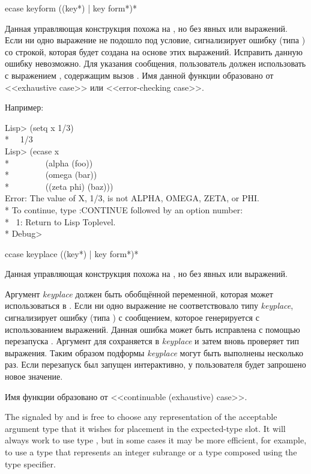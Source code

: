 \begin{defmac}
ecase keyform {({({key}*) | key} {form}*)}*

Данная управляющая конструкция похожа на , но без явных
 или  выражений. Если ни одно выражение не подошло под
условие,  сигнализирует ошибку (типа ) со строкой,
которая будет создана на основе этих выражений. Исправить данную ошибку
невозможно. Для указания сообщения, пользователь должен использовать 
с выражением , содержащим вызов . Имя данной функции
образовано от <<exhaustive case>> или <<error-checking case>>.

Например:
\begin{lisp}
Lisp> (setq x 1/3) \\*
~\EV\ 1/3 \\
Lisp> (ecase x \\*
~~~~~~~~(alpha (foo)) \\*
~~~~~~~~(omega (bar)) \\*
~~~~~~~~((zeta phi) (baz))) \\
Error: The value of X, 1/3, is not ALPHA, OMEGA, ZETA, or PHI. \\*
To continue, type :CONTINUE followed by an option number: \\*
~1: Return to Lisp Toplevel. \\*
Debug>
\end{lisp}
\end{defmac}

\begin{defmac}
ccase keyplace {({({key}*) | key} {form}*)}*

Данная управляющая конструкция похожа на , но без явных
 или  выражений.

Аргумент \emph{keyplace} должен быть обобщённой переменной, которая может
использоваться в . Если ни одно выражение не соответствовало типу
\emph{keyplace},  сигнализирует ошибку (типа ) с
сообщением, которое генерируется с использованием выражений. Данная ошибка может
быть исправлена с помощью перезапуска . Аргумент
для  сохраняется в \emph{keyplace} и затем 
вновь проверяет тип выражения. Таким образом подформы \emph{keyplace} могут быть
выполнены несколько раз. Если перезапуск  был запущен
интерактивно, у пользователя будет запрошено новое значение.

Имя функции образовано от <<continuable (exhaustive) case>>.

\beforenoterule
\begin{implementation}
  The  signaled by  and  is free to
  choose any representation of the acceptable argument type that it wishes
  for placement in the expected-type slot. It will always work to use type
  , but in some cases it may be more efficient, for example,
  to use a type that represents an integer subrange or a type composed using the
   type specifier.
\end{implementation}
\afternoterule
\end{defmac}

